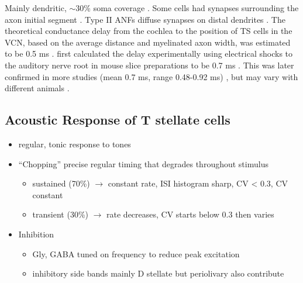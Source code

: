 Mainly dendritic, $\sim$30\% soma coverage \citep[Cat][]{Cant:1981,Cant:1982,RyugoWrightEtAl:1993,TolbertMorest:1982a}. 
\citep[cat][Soma: 36$\pm$10.5 \%  of 21 (range 6-38) \% area coverage, Prox: 43$\pm$29 \%  of 46 \% area cov., Distal: 40$\pm$12 \%  of 22 \% area cov.]{SmithRhode:1989}
Some cells had synapses surrounding the axon initial segment \citep{JosephsonMorest:1998}. 
Type II ANFs diffuse synapses on distal dendrites \citep{BensonBrown:2004}.
The theoretical conductance delay from the cochlea to the position of TS cells in the VCN, based on the average distance and myelinated axon width, was estimated to be 0.5 ms  \citep{Brown:1993,BrownLedwith:1990}. 
\citet{Oertel:1983} first calculated the delay experimentally using electrical shocks to the auditory nerve root in mouse slice preparations to be 0.7 ms \citep{Oertel:1983}. 
This was later confirmed in more studies (mean 0.7 ms, range 0.48-0.92 ms) \citep[Mice][]{FerragamoGoldingEtAl:1998a}, but may vary with different animals  \citep[0.5 ms in chinchilla][]{WickesbergOertel:1993}. 




\subsection{Acoustic Response of T stellate cells}


\begin{itemize}
\item regular, tonic response to tones \citep{RhodeOertelEtAl:1983,SmithRhode:1989,BlackburnSachs:1989}
\item ``Chopping'' precise regular timing that degrades throughout stimulus\citep{YoungRobertEtAl:1988,BlackburnSachs:1989}
\begin{itemize}
\item sustained (70\%) $\rightarrow$ constant rate, ISI histogram sharp, CV < 0.3, CV constant
\item transient (30\%) $\rightarrow$ rate decreases, CV starts below 0.3 then varies
\end{itemize}
\item Inhibition
\begin{itemize}
\item Gly, GABA tuned on frequency to reduce peak excitation \citep{CasparyBackoffEtAl:1994}
\item inhibitory side bands mainly D stellate \citep{FerragamoGoldingEtAl:1998a} but periolivary also contribute \citep{AdamsWarr:1976,Adams:1983,ShoreHelfertEtAl:1991,OstapoffBensonEtAl:1997}
\end{itemize}
\end{itemize}
\citep{PalombiCaspary:1992,RhodeSmith:1986,NelkenYoung:1994,PaoliniClareyEtAl:2005,PaoliniClareyEtAl:2004}  

